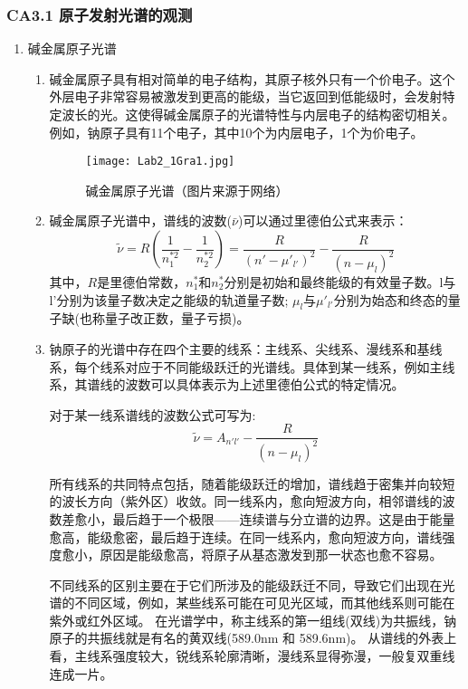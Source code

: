 \documentclass[dvipsnames, svgnames,a4paper,11pt]{article}
\begin{document}
	\subsubsection{CA3.1 原子发射光谱的观测}
	\begin{enumerate}
		\item 碱金属原子光谱
		\begin{enumerate}
			\item 碱金属原子具有相对简单的电子结构，其原子核外只有一个价电子。这个外层电子非常容易被激发到更高的能级，当它返回到低能级时，会发射特定波长的光。这使得碱金属原子的光谱特性与内层电子的结构密切相关。例如，钠原子具有11个电子，其中10个为内层电子，1个为价电子。
			
			\begin{figure}[htbp]
				\centering
				\texttt{[image: Lab2\_1Gra1.jpg]}
				\caption{碱金属原子光谱（图片来源于网络）}
				\label{fig:fig1}
			\end{figure}
			
			\item 碱金属原子光谱中，谱线的波数($\bar{\nu}$)可以通过里德伯公式来表示：
			\[
			\tilde{\nu} = R \left( \frac{1}{n_1^{*2}} - \frac{1}{n_2^{*2}} \right)=\dfrac{R}{(n'-\mu'_{l'})^2}-\dfrac{R}{(n-\mu_{l})^2}
			\]
			其中，$R$是里德伯常数，$n_1^*$和$n_2^*$分别是初始和最终能级的有效量子数。l与l'分别为该量子数决定之能级的轨道量子数;
			$\mu_{l}$与$\mu'_{l'}$分别为始态和终态的量子缺(也称量子改正数，量子亏损)。
			\item 钠原子的光谱中存在四个主要的线系：主线系、尖线系、漫线系和基线系，每个线系对应于不同能级跃迁的光谱线。具体到某一线系，例如主线系，其谱线的波数可以具体表示为上述里德伯公式的特定情况。
			
			对于某一线系谱线的波数公式可写为:
			\[\tilde{\nu} = A_{n'l'}-\dfrac{R}{(n-\mu_{l})^2}\]
			
			所有线系的共同特点包括，随着能级跃迁的增加，谱线趋于密集并向较短的波长方向（紫外区）收敛。同一线系内，愈向短波方向，相邻谱线的波数差愈小，最后趋于一个极限——连续谱与分立谱的边界。这是由于能量愈高，能级愈密，最后趋于连续。在同一线系内，愈向短波方向，谱线强度愈小，原因是能级愈高，将原子从基态激发到那一状态也愈不容易。
			
			不同线系的区别主要在于它们所涉及的能级跃迁不同，导致它们出现在光谱的不同区域，例如，某些线系可能在可见光区域，而其他线系则可能在紫外或红外区域。
			在光谱学中，称主线系的第一组线(双线)为共振线，钠原子的共振线就是有名的黄双线(589.0nm 和 589.6nm)。
			从谱线的外表上看，主线系强度较大，锐线系轮廓清晰，漫线系显得弥漫，一般复双重线连成一片。
		\end{enumerate}
		

\end{enumerate}
\end{document}
